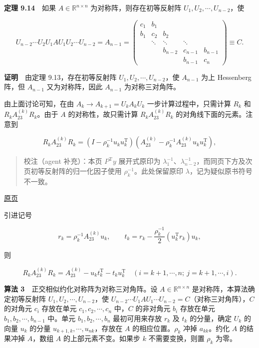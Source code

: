 \documentclass[
  10pt,
  fontset=fandol]{ctexart}
\begin{document}
\textbf{定理 9.14}　如果 \(A\in\mathbb R^{n\times n}\) 为对称阵，则存在初等反射阵 \(U_1,U_2,\cdots,U_{n-2}\)，使

\[
U_{n-2}\cdots U_2U_1AU_1U_2\cdots U_{n-2}=A_{n-1}
=\begin{pmatrix}
c_1&b_1&&&\\
b_1&c_2&b_2&&\\
&\ddots&\ddots&\ddots&\\
&&b_{n-2}&c_{n-1}&b_{n-1}\\
&&&b_{n-1}&c_n
\end{pmatrix}\equiv C.
\]

\textbf{证明}　由定理 9.13，存在初等反射阵 \(U_1,U_2,\cdots,U_{n-2}\)，使 \(A_{n-1}\) 为上 Hessenberg 阵，但 \(A_{n-1}\) 又为对称阵，因此 \(A_{n-1}\) 为对称三对角阵。

由上面讨论可知，在由 \(A_k\to A_{k+1}=U_kA_kU_k\) 一步计算过程中，只需计算 \(R_k\) 和 \(R_kA_{23}^{(k)}R_k\)。由于 \(A\) 的对称性，故只需计算 \(R_kA_{23}^{(k)}R_k\) 的对角线下面的元素。注意到

\[
R_kA_{23}^{(k)}R_k=(I-\rho_k^{-1}u_ku_k^{\mathrm T})(A_{23}^{(k)}-\rho_k^{-1}A_{23}^{(k)}u_ku_k^{\mathrm T}),
\]

\begin{quote}
校注（agent 补充）：本页 \(P^{\mathrm T}y\) 展开式原印为 \(\lambda_1^{-1}\)、\(\lambda_{n-2}^{-1}\)，而同页下方及次页初等反射阵的归一化因子使用 \(\rho_k^{-1}\)。此处保留原印 \(\lambda\)，记为疑似原书符号不一致。
\end{quote}

\href{../../source-images/pdf-248.jpeg}{原页}

引进记号

\[
r_k=\rho_k^{-1}A_{23}^{(k)}u_k,\qquad
 t_k=r_k-\frac{\rho_k^{-1}}2(u_k^{\mathrm T}r_k)u_k,
\]

则

\[
R_kA_{23}^{(k)}R_k=A_{23}^{(k)}-u_kt_k^{\mathrm T}-t_ku_k^{\mathrm T}
\quad(i=k+1,\cdots,n;\ j=k+1,\cdots,i).
\]

\textbf{算法 3}　正交相似约化对称阵为对称三对角阵。设 \(A\in\mathbb R^{n\times n}\) 是对称阵，本算法确定初等反射阵 \(U_1,U_2,\cdots,U_{n-2}\)，使 \(U_{n-2}\cdots U_1AU_1\cdots U_{n-2}=C\)（对称三对角阵），\(C\) 的对角元 \(c_i\) 存放在单元 \(c_1,c_2,\cdots,c_n\) 中，\(C\) 的非对角元 \(b_i\) 存放在单元 \(b_1,b_2,\cdots,b_{n-1}\) 中。单元 \(b_1,b_2,\cdots,b_n\) 最初可用来存放 \(r_k\) 及 \(t_k\) 的分量，确定 \(U_k\) 的向量 \(u_k\) 的分量 \(u_{k+1,k},\cdots,u_{nk}\)，存放在 \(A\) 的相应位置。\(\rho_k\) 冲掉 \(a_{kk}\)。约化 \(A\) 的结果冲掉 \(A\)，数组 \(A\) 的上部元素不变。如果步 \(k\) 不需要变换，则置 \(\rho_k\) 为零。
\end{document}
